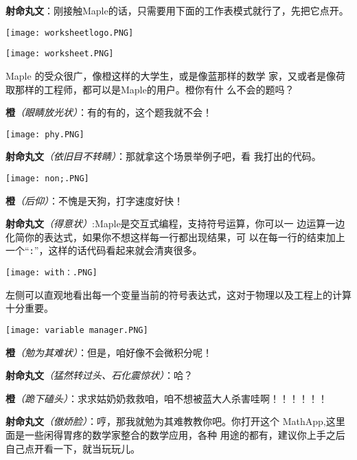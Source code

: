 \begin{multicols}{2}
    \textbf{射命丸文}：刚接触Maple的话，只需要用下面的工作表模式就行了，先把它点开。

    \begin{center}
        \texttt{[image: worksheetlogo.PNG]}
    \end{center}

    \begin{center}
        \texttt{[image: worksheet.PNG]}
    \end{center}

    Maple 的受众很广，像橙这样的大学生，或是像蓝那样的数学 家，又或者是像荷取那样的工程师，都可以是Maple的用户。橙你有什 么不会的题吗？

    \textbf{橙}\textit{（眼睛放光状）}：有的有的，这个题我就不会！
    \begin{center}
        \texttt{[image: phy.PNG]}
    \end{center}

    \textbf{射命丸文}\textit{（依旧目不转睛）}：那就拿这个场景举例子吧，看
    我打出的代码。

    \begin{center}
        \texttt{[image: non;.PNG]}
    \end{center}

    \textbf{橙}\textit{（后仰）}：不愧是天狗，打字速度好快！

    \textbf{射命丸文}\textit{（得意状）}:Maple是交互式编程，支持符号运算，你可以一
    边运算一边化简你的表达式，如果你不想这样每一行都出现结果，可
    以在每一行的结束加上一个“\verb":"”，这样的话代码看起来就会清爽很多。

    \begin{center}
        \texttt{[image: with：.PNG]}
    \end{center}

    左侧可以直观地看出每一个变量当前的符号表达式，这对于物理以及工程上的计算十分重要。

    \begin{center}
        \texttt{[image: variable manager.PNG]}
    \end{center}

    \textbf{橙}\textit{（勉为其难状）}：但是，咱好像不会微积分呢！

    \textbf{射命丸文}\textit{（猛然转过头、石化震惊状）}：哈？

    \textbf{橙}\textit{（跪下磕头）}：求求姑奶奶救救咱，咱不想被蓝大人杀害哇啊！！！！！！

    \textbf{射命丸文}\textit{（傲娇脸）}：哼，那我就勉为其难教教你吧。你打开这个
    MathApp,这里面是一些闲得胃疼的数学家整合的数学应用，各种
    用途的都有，建议你上手之后自己点开看一下，就当玩玩儿。


\end{multicols}
